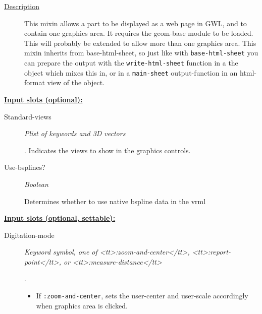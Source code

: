\documentclass [11pt]{book}
\begin{document}
\begin{itemize}
\begin{description}
\item [
\underline{Description}]


This mixin allows a part to be displayed as a web page in GWL, and
to contain one graphics area. It requires the geom-base module to be loaded. This will 
probably be extended to allow more than one graphics area. This mixin inherits from 
base-html-sheet, so just like with \texttt{base-html-sheet} you can prepare the output 
with the \texttt{write-html-sheet} function  in a the object which mixes  this in, or 
in a \texttt{main-sheet} output-function in an html-format view of the object.






\end{description}








\textbf{
\underline{Input slots (optional):}}

\begin{description}

\item [Standard-views]
\emph{Plist of keywords and 3D vectors}

.
Indicates the views to show in the graphics controls.




\item [Use-bsplines?]
\emph{Boolean}

 Determines whether to use native bspline data in the vrml




\end{description}






\textbf{
\underline{Input slots (optional, settable):}}

\begin{description}

\item [Digitation-mode]
\emph{Keyword symbol, one of <tt>:zoom-and-center</tt>, <tt>:report-point</tt>, or <tt>:measure-distance</tt>}

.


\begin{itemize}

\item If \texttt{:zoom-and-center}, sets the user-center and user-scale accordingly when graphics
area is clicked.



\end{itemize}
\end{description}
\end{itemize}
\end{document}
